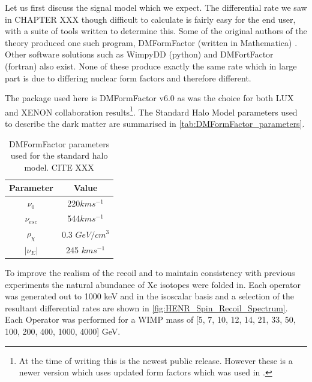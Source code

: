 



\iffalse
\par
Let us first discuss the signal model which we expect.
The differential rate we saw in CHAPTER XXX though difficult to calculate is fairly easy for the end user, with a suite of tools written to determine this.
Some of the original authors of the theory produced one such program, DMFormFactor (written in Mathematica) \cite{dmformfactor_ref}.
Other software solutions such as WimpyDD (python) and DMFortFactor (fortran) also exist.
None of these produce exactly the same rate which in large part is due to differing nuclear form factors and therefore different.

\par
The package used here is DMFormFactor v6.0 as was the choice for both LUX and XENON collaboration results\footnote{At the time of writing this is the newest public release. However these is a newer version which uses updated form factors which was used in \cite{pandax_2_eft_ref}.}.
The Standard Halo Model parameters used to describe the dark matter are summarised in \autoref{tab:DMFormFactor_parameters}.
\begin{table}[]
    \centering
    \begin{tabular}{c|c}
        Parameter         & Value  \\ \hline
        $\nu_0$           & 220$km s^{-1}$ \\
        $\nu_{esc}$       & 544$km s^{-1}$ \\
        $\rho_{\chi}$     & 0.3 $GeV/cm^{3}$ \\
        $|\nu_E|$         & 245 $km s^{-1}$ 
    \end{tabular}
    \caption{DMFormFactor parameters used for the standard halo model. CITE XXX}
    \label{tab:DMFormFactor_parameters}
\end{table}
To improve the realism of the recoil and to maintain consistency with previous experiments the natural abundance of Xe isotopes were folded in.
Each operator was generated out to 1000 keV and in the isoscalar basis and a selection of the resultant differential rates are shown in \autoref{fig:HENR_Spin_Recoil_Spectrum}.
Each Operator was performed for a WIMP mass of [5, 7, 10, 12, 14, 21, 33, 50, 100, 200, 400, 1000, 4000] GeV.









